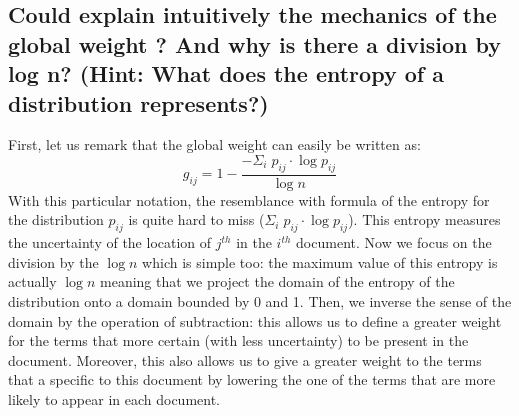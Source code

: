 \documentclass[10pt, a4paper, oneside]{article} %
\begin{document}
\subsection{Could explain intuitively the mechanics of the global weight ? And why is there a division by log n? (Hint: What does the entropy of a distribution represents?)}
First, let us remark that the global weight can easily be written as: \begin{equation}
g_{ij} = 1 - \frac{-\Sigma_i\; p_{ij}\cdot \log p_{ij}}{\log n}
\end{equation}
With this particular notation, the resemblance with formula of the entropy for the distribution $p_{ij}$ is quite hard to miss ($\Sigma_i\; p_{ij}\cdot \log p_{ij}$). This entropy measures the uncertainty of the location of $j^{th}$ in the $i^{th}$ document. Now we focus on the division by the $\log n$ which is simple too: the maximum value of this entropy is actually $\log n$ meaning that we project the domain of the entropy of the distribution onto a domain bounded by 0 and 1. Then, we inverse the sense of the domain by the operation of subtraction: this allows us to define a greater weight for the terms that more certain (with less uncertainty) to be present in the document. Moreover, this also allows us to give a greater weight to the terms that a specific to this document by lowering the one of the terms that are more likely to appear in each document.
\end{document}
